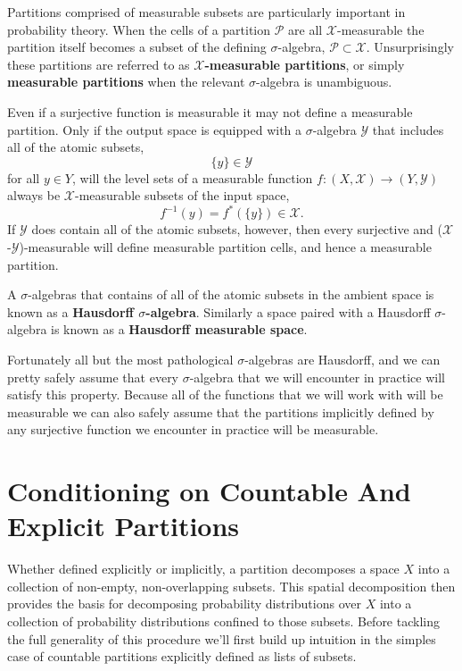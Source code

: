 \documentclass[
  letterpaper,
  DIV=11,
  numbers=noendperiod]{scrartcl}
\begin{document}
Partitions comprised of measurable subsets are particularly important in
probability theory. When the cells of a partition \(\mathcal{P}\) are
all \(\mathcal{X}\)-measurable the partition itself becomes a subset of
the defining \(\sigma\)-algebra, \(\mathcal{P} \subset \mathcal{X}\).
Unsurprisingly these partitions are referred to as
\textbf{\(\mathcal{X}\)-measurable partitions}, or simply
\textbf{measurable partitions} when the relevant \(\sigma\)-algebra is
unambiguous.

Even if a surjective function is measurable it may not define a
measurable partition. Only if the output space is equipped with a
\(\sigma\)-algebra \(\mathcal{Y}\) that includes all of the atomic
subsets, \[
\{ y \} \in \mathcal{Y}
\] for all \(y \in Y\), will the level sets of a measurable function
\(f : (X, \mathcal{X}) \rightarrow (Y, \mathcal{Y})\) always be
\(\mathcal{X}\)-measurable subsets of the input space, \[
f^{-1}( y ) = f^{*}( \{ y \} ) \in \mathcal{X}.
\] If \(\mathcal{Y}\) does contain all of the atomic subsets, however,
then every surjective and (\(\mathcal{X}\)-\(\mathcal{Y}\))-measurable
will define measurable partition cells, and hence a measurable
partition.

A \(\sigma\)-algebras that contains of all of the atomic subsets in the
ambient space is known as a \textbf{Hausdorff \(\sigma\)-algebra}.
Similarly a space paired with a Hausdorff \(\sigma\)-algebra is known as
a \textbf{Hausdorff measurable space}.

Fortunately all but the most pathological \(\sigma\)-algebras are
Hausdorff, and we can pretty safely assume that every \(\sigma\)-algebra
that we will encounter in practice will satisfy this property. Because
all of the functions that we will work with will be measurable we can
also safely assume that the partitions implicitly defined by any
surjective function we encounter in practice will be measurable.

\section{Conditioning on Countable And Explicit
Partitions}\label{sec:explicit-conditional}

Whether defined explicitly or implicitly, a partition decomposes a space
\(X\) into a collection of non-empty, non-overlapping subsets. This
spatial decomposition then provides the basis for decomposing
probability distributions over \(X\) into a collection of probability
distributions confined to those subsets. Before tackling the full
generality of this procedure we'll first build up intuition in the
simples case of countable partitions explicitly defined as lists of
subsets.
\end{document}

